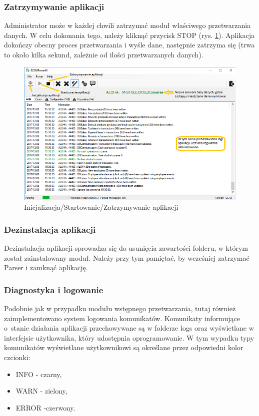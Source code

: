 \documentclass[a4paper]{book}
\begin{document}
\subsubsection{Zatrzymywanie aplikacji}
Administrator może w każdej chwili zatrzymać moduł właściwego przetwarzania danych. W celu dokonania tego, należy kliknąć przycisk STOP (rys. \ref{fig:zatrzymywanie_aplikacji}). Aplikacja dokończy obecny proces przetwarzania i wyśle dane, następnie zatrzyma się (trwa to około kilka sekund, zależnie od ilości przetwarzanych danych).
\begin{figure}[t]
	\centering
	\hspace*{-4.5cm}\includegraphics{./img/zatrzymywanie_aplikacji.png}
	\caption{Inicjalizacja/Startowanie/Zatrzymywanie aplikacji}
	\label{fig:zatrzymywanie_aplikacji}
\end{figure}
\subsubsection{Dezinstalacja aplikacji}
Dezinstalacja aplikacji sprowadza się do usunięcia zawartości folderu, w którym został zainstalowany moduł. Należy przy tym pamiętać, by wcześniej zatrzymać Parser i zamknąć aplikację.
\subsubsection{Diagnostyka i logowanie}
Podobnie jak w przypadku modułu wstępnego przetwarzania, tutaj również zaimplementowano system logowania komunikatów. Komunikaty informujące o~stanie działania aplikacji przechowywane są w folderze logs oraz wyświetlane w interfejsie użytkownika, który udostępnia oprogramowanie. W tym wypadku typy komunikatów wyświetlane użytkownikowi są określane przez odpowiedni kolor czcionki:
 \begin{itemize}
 	\item INFO - czarny,
 	\item WARN - zielony,
 	\item ERROR -czerwony.
 \end{itemize}
\end{document}
